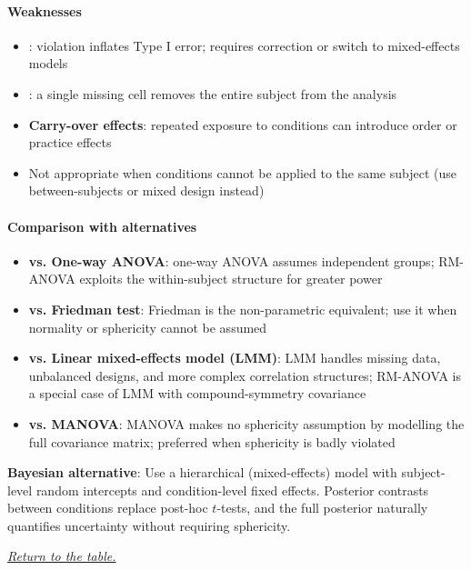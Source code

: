 \paragraph{Weaknesses}
\begin{itemize}
    \item {}: violation inflates Type I error; requires
        correction or switch to mixed-effects models
    \item {}: a single missing cell removes the entire
        subject from the analysis
    \item \textbf{Carry-over effects}: repeated exposure to conditions can introduce
        order or practice effects
    \item Not appropriate when conditions cannot be applied to the same subject (use
        between-subjects or mixed design instead)
\end{itemize}

\paragraph{Comparison with alternatives}
\begin{itemize}
    \item \textbf{vs. One-way ANOVA}: one-way ANOVA assumes independent groups; RM-ANOVA
        exploits the within-subject structure for greater power
    \item \textbf{vs. Friedman test}: Friedman is the non-parametric equivalent; use it
        when normality or sphericity cannot be assumed
    \item \textbf{vs. Linear mixed-effects model (LMM)}: LMM handles missing data,
        unbalanced designs, and more complex correlation structures; RM-ANOVA is a
        special case of LMM with compound-symmetry covariance
    \item \textbf{vs. MANOVA}: MANOVA makes no sphericity assumption by modelling the
        full covariance matrix; preferred when sphericity is badly violated
\end{itemize}

\textbf{Bayesian alternative}: Use a hierarchical (mixed-effects) model with
subject-level random intercepts and condition-level fixed effects. Posterior contrasts
between conditions replace post-hoc $t$-tests, and the full posterior naturally
quantifies uncertainty without requiring sphericity.

\textit{\hyperref[statistical_method_table]{Return to the table.}}

